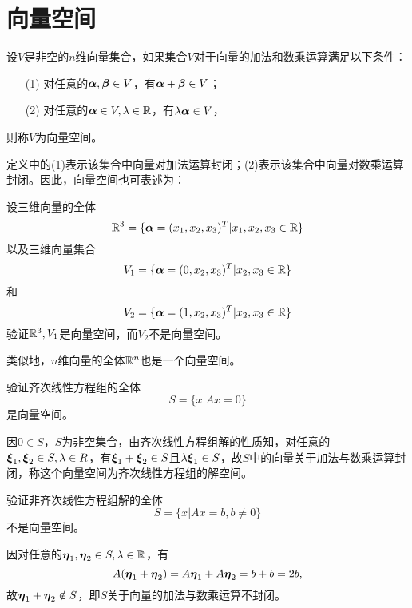 \section{向量空间}

\begin{frame}\ft{\secname}
\begin{dingyi}[向量空间]
  设$V$是非空的$n$维向量集合，如果集合$V$对于向量的加法和数乘运算满足以下条件：
  \begin{itemize}
  \item[(1)] 对任意的$\boldsymbol{\alpha},\boldsymbol{\beta}\in V$，有$\boldsymbol{\alpha}+\boldsymbol{\beta}\in V$；
  \item[(2)] 对任意的$\boldsymbol{\alpha}\in V,\lambda \in \mathbb R$，有$\lambda\boldsymbol{\alpha}\in V$，
  \end{itemize}
  则称$V$为向量空间。
\end{dingyi} \pause 
定义中的(1)表示该集合中向量对加法运算封闭；(2)表示该集合中向量对数乘运算封闭。因此，向量空间也可表述为：
\end{frame}

\begin{frame}\ft{\secname}
\begin{li}
  设三维向量的全体
  $$
  \mathbb R^3=\{\boldsymbol{\alpha}=(x_1,x_2,x_3)^T|x_1,x_2,x_3\in\mathbb R\}
  $$
  以及三维向量集合
  $$
  V_1=\{\boldsymbol{\alpha}=(0,x_2,x_3)^T|x_2,x_3\in\mathbb R\}
  $$
  和
  $$
  V_2=\{\boldsymbol{\alpha}=(1,x_2,x_3)^T|x_2,x_3\in\mathbb R\}
  $$
  验证$\mathbb R^3, V_1$是向量空间，而$V_2$不是向量空间。
\end{li}
\pause 
类似地，$n$维向量的全体$\mathbb R^n$也是一个向量空间。

\end{frame}

\begin{frame}\ft{\secname}

  \begin{li}
  验证齐次线性方程组的全体
  $$
  S=\{x|Ax=0\}
  $$
  是向量空间。
\end{li} \pause 
\begin{jie}
  因$0\in S$，$S$为非空集合，由齐次线性方程组解的性质知，对任意的$\boldsymbol{\xi}_1,\boldsymbol{\xi}_2\in S,\lambda \in R$，有$\boldsymbol{\xi}_1+\boldsymbol{\xi}_2\in S$且$\lambda \boldsymbol{\xi}_1\in S$，故$S$中的向量关于加法与数乘运算封闭，称这个向量空间为齐次线性方程组的解空间。 
\end{jie}

\end{frame}

\begin{frame}\ft{\secname}

\begin{li}
  验证非齐次线性方程组解的全体
  $$
  S=\{x|Ax=b, b\ne 0\}
  $$
  不是向量空间。
\end{li} \pause 
\begin{jie}
  因对任意的$\boldsymbol{\eta}_1,\boldsymbol{\eta}_2\in S, \lambda\in \mathbb R$，有
  $$
  A(\boldsymbol{\eta}_1+\boldsymbol{\eta}_2)=A\boldsymbol{\eta}_1+A\boldsymbol{\eta}_2=b+b=2b,
  $$
  故$\boldsymbol{\eta}_1+\boldsymbol{\eta}_2\notin S$，即$S$关于向量的加法与数乘运算不封闭。
\end{jie}
\end{frame}

